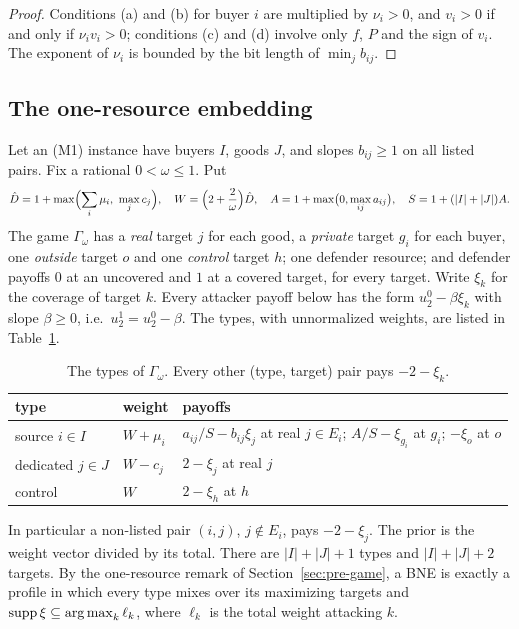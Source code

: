 \begin{proof}
Conditions (a) and (b) for buyer $i$ are multiplied by $\nu_i>0$, and $v_i>0$ if and only if
$\nu_iv_i>0$; conditions (c) and (d) involve only $f$, $P$ and the sign of $v_i$. The exponent of
$\nu_i$ is bounded by the bit length of $\min_jb_{ij}$.
\end{proof}

\subsection{The one-resource embedding}

Let an (M1) instance have buyers $I$, goods $J$, and slopes $b_{ij}\ge1$ on all
listed pairs. Fix a rational $0<\omega\le1$. Put
\begin{equation}\label{eq:mk-consts}
\hat D=1+\max\Bigl(\sum_i\mu_i,\ \max_jc_j\Bigr),\quad W=\Bigl(2+\frac2\omega\Bigr)\hat D,\quad
A=1+\max\bigl(0,\max_{ij}a_{ij}\bigr),\quad S=1+(|I|+|J|)A .
\end{equation}
The game $\Gamma_\omega$ has a \emph{real} target $j$ for each good, a \emph{private} target $g_i$ for
each buyer, one \emph{outside} target $o$ and one \emph{control} target $h$; one defender resource; and
defender payoffs $0$ at an uncovered and $1$ at a covered target, for every target. Write $\xi_k$ for
the coverage of target $k$. Every attacker payoff below has the form $u_2^0-\beta\xi_k$ with slope
$\beta\ge0$, i.e.\ $u_2^1=u_2^0-\beta$. The types, with unnormalized weights, are listed in
Table~\ref{tab:mk-types}.
\begin{table}[h]
\centering
\begin{tabular}{lll}
\toprule
type & weight & payoffs \\
\midrule
source $i\in I$ & $W+\mu_i$ & $a_{ij}/S-b_{ij}\xi_j$ at real $j\in E_i$; $A/S-\xi_{g_i}$ at $g_i$; $-\xi_o$ at $o$\\
dedicated $j\in J$ & $W-c_j$ & $2-\xi_j$ at real $j$\\
control & $W$ & $2-\xi_h$ at $h$\\
\bottomrule
\end{tabular}
\caption{The types of $\Gamma_\omega$. Every other (type, target) pair pays $-2-\xi_k$.}
\label{tab:mk-types}
\end{table}

In particular a non-listed pair $(i,j)$, $j\notin E_i$, pays $-2-\xi_j$. The prior is the weight vector
divided by its total. There are $|I|+|J|+1$ types and $|I|+|J|+2$ targets. By the one-resource remark of
Section~\ref{sec:pre-game}, a BNE is exactly a profile in which every type mixes over its maximizing
targets and $\operatorname{supp}\xi\subseteq\operatorname*{arg\,max}_k\ell_k$, where $\ell_k$ is the total weight attacking $k$.

